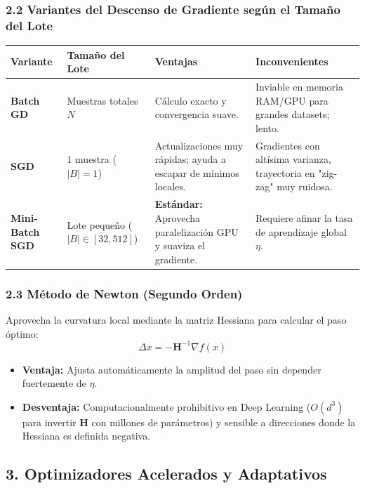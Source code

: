 \subsubsection{2.2 Variantes del Descenso de Gradiente según el Tamaño del Lote}

\begin{table}[htbp]
	\centering
	\small
	\begin{tabular}{|p{3cm}|p{2.5cm}|p{3.5cm}|p{4.5cm}|}
		\hline
		\textbf{Variante} & \textbf{Tamaño del Lote} & \textbf{Ventajas} & \textbf{Inconvenientes} \\ \hline
		\textbf{Batch GD} & Muestras totales $N$ & Cálculo exacto y convergencia suave. & Inviable en memoria RAM/GPU para grandes datasets; lento. \\ \hline
		\textbf{SGD} & $1$ muestra ($\vert B\vert = 1$) & Actualizaciones muy rápidas; ayuda a escapar de mínimos locales. & Gradientes con altísima varianza, trayectoria en "zig-zag" muy ruidosa. \\ \hline
		\textbf{Mini-Batch SGD} & Lote pequeño ($\vert B\vert \in [32, 512]$) & \textbf{Estándar:} Aprovecha paralelización GPU y suaviza el gradiente. & Requiere afinar la tasa de aprendizaje global $\eta$. \\ \hline
	\end{tabular}
\end{table}

\subsubsection{2.3 Método de Newton (Segundo Orden)}

Aprovecha la curvatura local mediante la matriz Hessiana para calcular el paso óptimo:
$$\Delta x = -\mathbf{H}^{-1} \nabla f(x)$$

\begin{itemize}
	\item \textbf{Ventaja:} Ajusta automáticamente la amplitud del paso sin depender fuertemente de $\eta$.
	\item \textbf{Desventaja:} Computacionalmente prohibitivo en Deep Learning ($O(d^3)$ para invertir $\mathbf{H}$ con millones de parámetros) y sensible a direcciones donde la Hessiana es definida negativa.
\end{itemize}

\subsection{3. Optimizadores Acelerados y Adaptativos}

